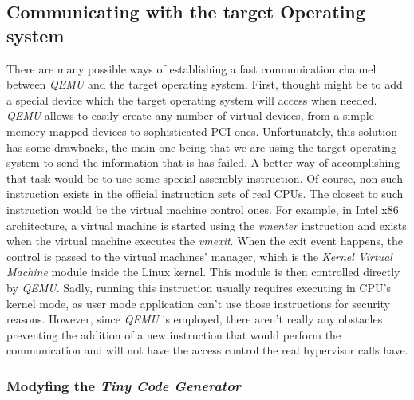 \subsection{Communicating with the target Operating system}
There are many possible ways of establishing a fast communication channel between \textit{QEMU} and the target operating system. First, thought might be to add a special device which the target operating system will access when needed. \textit{QEMU} allows to easily create any number of virtual devices, from a simple memory mapped devices to sophisticated PCI ones. Unfortunately, this solution has some drawbacks, the main one being that we are using the target operating system to send the information that is has failed. A better way of accomplishing that task would be to use some special assembly instruction. Of course, non such instruction exists in the official instruction sets of real CPUs. The closest to such instruction would be the virtual machine control ones. For example, in Intel x86 architecture, a virtual machine is started using the \textit{vmenter} instruction and exists when the virtual machine executes the \textit{vmexit}. When the exit event happens, the control is passed to the virtual machines' manager, which is the \textit{Kernel Virtual Machine} module inside the Linux kernel. This module is then controlled directly by \textit{QEMU}. Sadly, running this instruction usually requires executing in CPU's kernel mode, as user mode application can't use those instructions for security reasons. However, since \textit{QEMU} is employed, there aren't really any obstacles preventing the addition of a new instruction that would perform the communication and will not have the access control the real hypervisor calls have.

\subsubsection{Modyfing the \textit{Tiny Code Generator}} \label{sec:tcg}
